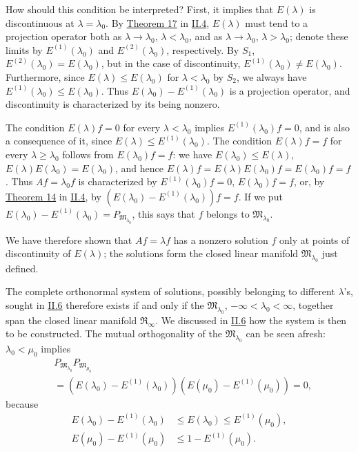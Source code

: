 \documentclass[fontsize=13pt,twoside,openany,headings=normal,parskip=false,bookmarkpackage=false,DIV=calc]{scrbook}
\begin{document}
How should this condition be interpreted? First, it implies that $E(\lambda)$ is discontinuous at $\lambda=\lambda_0$. By \hyperref[thm:II.17]{Theorem 17} in \hyperref[sec:II.4]{II.4}, $E(\lambda)$ must tend to a projection operator both as $\lambda\to\lambda_0$, $\lambda<\lambda_0$, and as $\lambda\to\lambda_0$, $\lambda>\lambda_0$; denote these limits by $E^{(1)}(\lambda_0)$ and $E^{(2)}(\lambda_0)$, respectively. By $\hyperref[cond:II.S1]{S_1}$, $E^{(2)}(\lambda_0)=E(\lambda_0)$, but in the case of discontinuity, $E^{(1)}(\lambda_0)\ne E(\lambda_0)$. Furthermore, since $E(\lambda)\leq E(\lambda_0)$ for $\lambda<\lambda_0$ by $\hyperref[cond:II.S2]{S_2}$, we always have $E^{(1)}(\lambda_0)\leq E(\lambda_0)$. Thus $E(\lambda_0)-E^{(1)}(\lambda_0)$ is a projection operator, and discontinuity is characterized by its being nonzero.

The condition $E(\lambda)f=0$ for every $\lambda<\lambda_0$ implies $E^{(1)}(\lambda_0)f=0$, and is also a consequence of it, since $E(\lambda)\leq E^{(1)}(\lambda_0)$. The condition $E(\lambda)f=f$ for every $\lambda\geq\lambda_0$ follows from $E(\lambda_0)f=f$: we have $E(\lambda_0)\leq E(\lambda)$, $E(\lambda)E(\lambda_0)=E(\lambda_0)$, and hence $E(\lambda)f=E(\lambda)E(\lambda_0)f=E(\lambda_0)f=f$. Thus $Af=\lambda_0f$ is characterized by $E^{(1)}(\lambda_0)f=0$, $E(\lambda_0)f=f$, or, by \hyperref[thm:II.14]{Theorem 14} in \hyperref[sec:II.4]{II.4}, by $(E(\lambda_0)-E^{(1)}(\lambda_0))f=f$. If we put $E(\lambda_0)-E^{(1)}(\lambda_0)=P_{\mathfrak{M}_{\lambda_0}}$, this says that $f$ belongs to $\mathfrak{M}_{\lambda_0}$.

We have therefore shown that $Af=\lambda f$ has a nonzero solution $f$ only at points of discontinuity of $E(\lambda)$; the solutions form the closed linear manifold $\mathfrak{M}_{\lambda_0}$ just defined.

The complete orthonormal system of solutions, possibly belonging to different $\lambda$'s, sought in \hyperref[sec:II.6]{II.6} therefore exists if and only if the $\mathfrak{M}_{\lambda_0}$, $-\infty<\lambda_0<\infty$, together span the closed linear manifold $\mathfrak{R}_\infty$. We discussed in \hyperref[sec:II.6]{II.6} how the system is then to be constructed. The mutual orthogonality of the $\mathfrak{M}_{\lambda_0}$ can be seen afresh: $\lambda_0<\mu_0$ implies
\begin{align*}
&P_{\mathfrak{M}_{\lambda_0}}P_{\mathfrak{M}_{\mu_0}}\\
&=(E(\lambda_0)-E^{(1)}(\lambda_0))(E(\mu_0)-E^{(1)}(\mu_0))=0,
\end{align*}
because
\begin{align*}
E(\lambda_0)-E^{(1)}(\lambda_0)&\leq E(\lambda_0)\leq E^{(1)}(\mu_0),\\
E(\mu_0)-E^{(1)}(\mu_0)&\leq1-E^{(1)}(\mu_0).
\end{align*}
\end{document}
